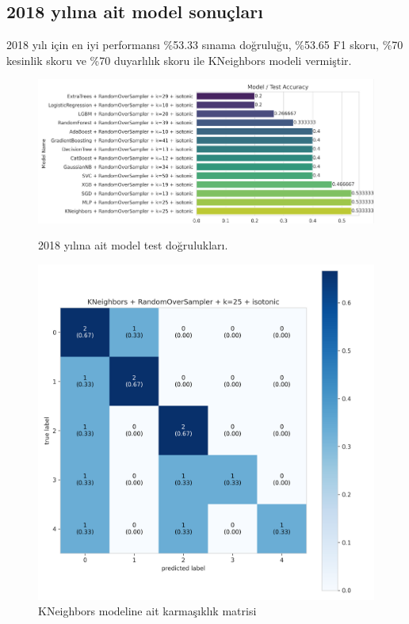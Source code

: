 \newpage

\subsection{2018 yılına ait model sonuçları}
2018 yılı için en iyi performansı \%53.33 sınama doğruluğu,  \%53.65 F1 skoru, \%70 kesinlik skoru ve \%70 duyarlılık skoru ile KNeighbors modeli vermiştir.

\begin{figure}[ht]
\centering
\begin{minipage}[b]{0.6\textwidth}
    \centering
    \includegraphics[width=\textwidth]{2018.png}
    \caption{2018 yılına ait model test doğrulukları.}
    \label{fig:resim1}
\end{minipage}
\hfill
\begin{minipage}[b]{0.6\textwidth}
    \centering
    \includegraphics[width=\textwidth]{2018_cm.png}
    \caption{KNeighbors modeline ait karmaşıklık matrisi}
    \label{fig:resim2}
\end{minipage}
\end{figure}

